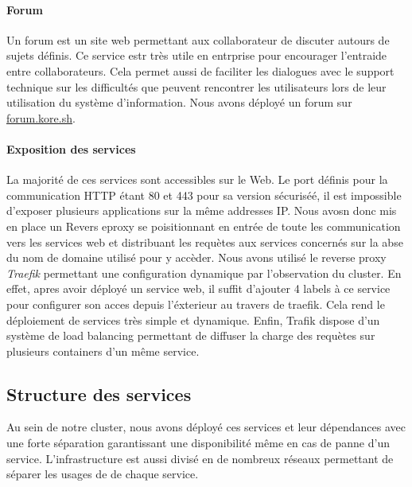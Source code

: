 \paragraph{Forum} Un forum est un site web permettant aux collaborateur de discuter autours de sujets définis.
Ce service estr très utile en entrprise pour encourager l'entraide entre collaborateurs.
Cela permet aussi de faciliter les dialogues avec le support technique sur les difficultés que peuvent rencontrer les utilisateurs lors de leur utilisation du système d'information.
Nous avons déployé un forum sur \url{forum.kore.sh}.

\paragraph{Exposition des services} La majorité de ces services sont accessibles sur le Web.
Le port définis pour la communication HTTP étant 80 et 443 pour sa version sécuriséé, il est impossible d'exposer plusieurs applications sur la même addresses IP.
Nous avosn donc mis en place un Revers eproxy se poisitionnant en entrée de toute les communication vers les services web et distribuant les requètes aux services concernés sur la abse du nom de domaine utilisé pour y accèder.
Nous avons utilisé le reverse proxy \emph{Traefik} permettant une configuration dynamique par l'observation du cluster.
En effet, apres avoir déployé un service web, il suffit d'ajouter 4 labels à ce service pour configurer son acces depuis l'éxterieur au travers de traefik.
Cela rend le déploiement de services très simple et dynamique.
Enfin, Trafik dispose d'un système de load balancing permettant de diffuser la charge des requètes sur plusieurs containers d'un même service.

\subsection{Structure des services}

Au sein de notre cluster, nous avons déployé ces services et leur dépendances avec une forte séparation garantissant une disponibilité même en cas de panne d'un service.
L'infrastructure est aussi divisé en de nombreux réseaux permettant de séparer les usages de de chaque service.
